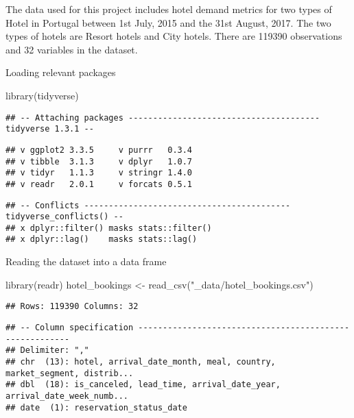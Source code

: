 \documentclass[
]{article}
\newenvironment{Shaded}{\begin{snugshade}}{\end{snugshade}}
\newcommand{\FunctionTok}[1]{\textcolor[rgb]{0.00,0.00,0.00}{#1}}
\newcommand{\NormalTok}[1]{#1}
\newcommand{\OtherTok}[1]{\textcolor[rgb]{0.56,0.35,0.01}{#1}}
\newcommand{\StringTok}[1]{\textcolor[rgb]{0.31,0.60,0.02}{#1}}
\begin{document}
The data used for this project includes hotel demand metrics for two
types of Hotel in Portugal between 1st July, 2015 and the 31st August,
2017. The two types of hotels are Resort hotels and City hotels. There
are 119390 observations and 32 variables in the dataset.

Loading relevant packages

\begin{Shaded}
\begin{Highlighting}[]
\FunctionTok{library}\NormalTok{(tidyverse)}
\end{Highlighting}
\end{Shaded}

\begin{verbatim}
## -- Attaching packages --------------------------------------- tidyverse 1.3.1 --
\end{verbatim}

\begin{verbatim}
## v ggplot2 3.3.5     v purrr   0.3.4
## v tibble  3.1.3     v dplyr   1.0.7
## v tidyr   1.1.3     v stringr 1.4.0
## v readr   2.0.1     v forcats 0.5.1
\end{verbatim}

\begin{verbatim}
## -- Conflicts ------------------------------------------ tidyverse_conflicts() --
## x dplyr::filter() masks stats::filter()
## x dplyr::lag()    masks stats::lag()
\end{verbatim}

Reading the dataset into a data frame

\begin{Shaded}
\begin{Highlighting}[]
\FunctionTok{library}\NormalTok{(readr)}
\NormalTok{hotel\_bookings }\OtherTok{\textless{}{-}} \FunctionTok{read\_csv}\NormalTok{(}\StringTok{"\_data/hotel\_bookings.csv"}\NormalTok{)}
\end{Highlighting}
\end{Shaded}

\begin{verbatim}
## Rows: 119390 Columns: 32
\end{verbatim}

\begin{verbatim}
## -- Column specification --------------------------------------------------------
## Delimiter: ","
## chr  (13): hotel, arrival_date_month, meal, country, market_segment, distrib...
## dbl  (18): is_canceled, lead_time, arrival_date_year, arrival_date_week_numb...
## date  (1): reservation_status_date
\end{verbatim}
\end{document}
